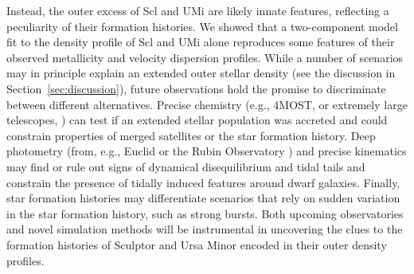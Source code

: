 \documentclass[linenumbers, twocolumn, twocolappendix]{aastex701}
\begin{document}
Instead, the outer excess of Scl and UMi are likely innate features, reflecting a peculiarity of their formation histories. 
We showed that a two-component model fit to the density profile of Scl and UMi alone reproduces some features of their observed metallicity and velocity dispersion profiles. 
While a number of scenarios may in principle explain an extended outer stellar density (see the discussion in Section~\ref{sec:discussion}), future observations hold the promise to discriminate between different alternatives.  
Precise chemistry (e.g., 4MOST, \citealt{skuladottir+2023} or extremely large telescopes, \citealt{jagourel+2018}) can test if an extended stellar population was accreted and could constrain properties of merged satellites or the star formation history. 
Deep photometry (from, e.g., Euclid \citealt{euclidcollaboration+2025} or the Rubin Observatory \citealt{ivezic+2019}) and precise kinematics may find or rule out signs of dynamical disequilibrium and tidal tails and constrain the presence of tidally induced features around dwarf galaxies.
Finally, star formation histories may differentiate scenarios that rely on sudden variation in the star formation history, such as strong bursts. 
Both upcoming observatories and novel simulation methods will be instrumental in uncovering the clues to the formation histories of Sculptor and Ursa Minor encoded in their outer density profiles.

\end{document}
